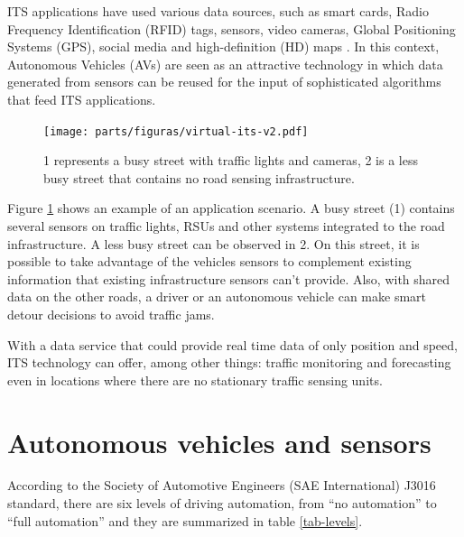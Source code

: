 ITS applications have used various data sources, such as smart cards, Radio Frequency Identification (RFID) tags, sensors, video cameras, Global Positioning Systems (GPS), social media and high-definition (HD) maps \cite{bhatia2022intelligent}. In this context, Autonomous Vehicles (AVs) are seen as an attractive technology in which data generated from sensors can be reused for the input of sophisticated algorithms that feed ITS applications.

\begin{figure} [!ht]
    \centering
    \texttt{[image: parts/figuras/virtual-its-v2.pdf]}
    \caption{1 represents a busy street with traffic lights and cameras, 2 is a less busy street that contains no road sensing infrastructure.}
    \label{fig:virtual_its_infrastructure}
\end{figure}

Figure \ref{fig:virtual_its_infrastructure} shows an example of an application scenario. A busy street (1) contains several sensors on traffic lights, RSUs and other systems integrated to the road infrastructure. A less busy street can be observed in 2. On this street, it is possible to take advantage of the vehicles sensors to complement existing information that existing infrastructure sensors can't provide. Also, with shared data on the other roads, a driver or an autonomous vehicle can make smart detour decisions to avoid traffic jams.

With a data service that could provide real time data of only position and speed, ITS technology can offer, among other things: traffic monitoring and forecasting even in locations where there are no stationary traffic sensing units.

\section{Autonomous vehicles and sensors}\label{av-sensors}

According to the Society of Automotive Engineers (SAE International) J3016 standard, there are six levels of driving automation, from  “no automation” to “full automation” and they are summarized in table \ref{tab-levels}.

